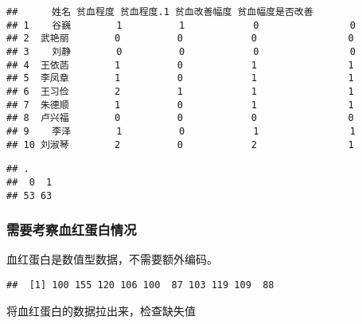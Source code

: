 \documentclass[
]{article}
\newenvironment{Shaded}{\begin{snugshade}}{\end{snugshade}}
\newcommand{\DecValTok}[1]{\textcolor[rgb]{0.00,0.00,0.81}{#1}}
\newcommand{\FunctionTok}[1]{\textcolor[rgb]{0.00,0.00,0.00}{#1}}
\newcommand{\NormalTok}[1]{#1}
\newcommand{\SpecialCharTok}[1]{\textcolor[rgb]{0.00,0.00,0.00}{#1}}
\begin{document}
\begin{verbatim}
##      姓名 贫血程度 贫血程度.1 贫血改善幅度 贫血幅度是否改善
## 1    谷巍        1          1            0                0
## 2  武艳丽        0          0            0                0
## 3    刘静        0          0            0                0
## 4  王依菡        1          0            1                1
## 5  李凤章        1          0            1                1
## 6  王习俭        2          1            1                1
## 7  朱德顺        1          0            1                1
## 8  卢兴福        0          0            0                0
## 9    李泽        1          0            1                1
## 10 刘淑琴        2          0            2                1
\end{verbatim}

\begin{Shaded}
\end{Shaded}

\begin{verbatim}
## .
##  0  1 
## 53 63
\end{verbatim}

\hypertarget{ux9700ux8981ux8003ux5bdfux8840ux7ea2ux86cbux767dux60c5ux51b5}{%
\subsubsection{需要考察血红蛋白情况}\label{ux9700ux8981ux8003ux5bdfux8840ux7ea2ux86cbux767dux60c5ux51b5}}

血红蛋白是数值型数据，不需要额外编码。

\begin{Shaded}
\end{Shaded}

\begin{verbatim}
##  [1] 100 155 120 106 100  87 103 119 109  88
\end{verbatim}

将血红蛋白的数据拉出来，检查缺失值
\end{document}
